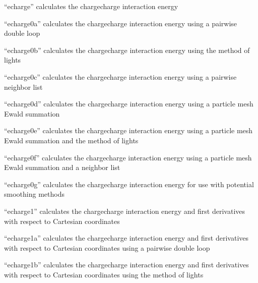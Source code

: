 \documentclass[letterpaper,11pt,english]{sphinxmanual}
\begin{document}

“echarge” calculates the charge\sphinxhyphen{}charge interaction energy


“echarge0a” calculates the charge\sphinxhyphen{}charge interaction energy
using a pairwise double loop


“echarge0b” calculates the charge\sphinxhyphen{}charge interaction energy
using the method of lights


“echarge0c” calculates the charge\sphinxhyphen{}charge interaction energy
using a pairwise neighbor list


“echarge0d” calculates the charge\sphinxhyphen{}charge interaction energy
using a particle mesh Ewald summation


“echarge0e” calculates the charge\sphinxhyphen{}charge interaction energy
using a particle mesh Ewald summation and the method of lights


“echarge0f” calculates the charge\sphinxhyphen{}charge interaction energy
using a particle mesh Ewald summation and a neighbor list


“echarge0g” calculates the charge\sphinxhyphen{}charge interaction energy
for use with potential smoothing methods


“echarge1” calculates the charge\sphinxhyphen{}charge interaction energy
and first derivatives with respect to Cartesian coordinates


“echarge1a” calculates the charge\sphinxhyphen{}charge interaction energy
and first derivatives with respect to Cartesian coordinates
using a pairwise double loop


“echarge1b” calculates the charge\sphinxhyphen{}charge interaction energy
and first derivatives with respect to Cartesian coordinates
using the method of lights
\end{document}
